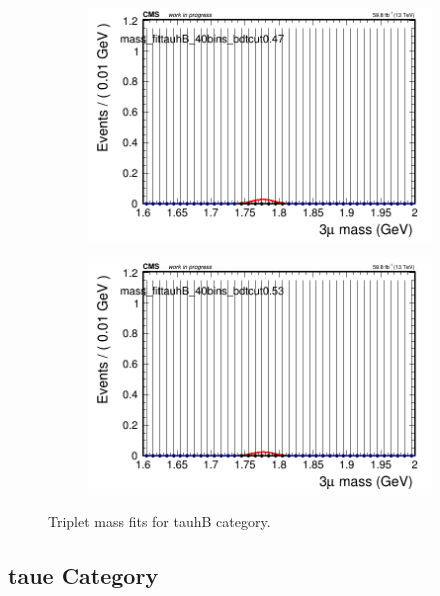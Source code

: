 \begin{figure}[H]
\begin{subfigure}{0.2\textwidth}
        \includegraphics[width=\textwidth]{power_law/plots/tauhB/massfit_tauhB_40bins_bdtcut0.47.png}
        \caption{}
    \end{subfigure}
    \begin{subfigure}{0.2\textwidth}
        \includegraphics[width=\textwidth]{power_law/plots/tauhB/massfit_tauhB_40bins_bdtcut0.53.png}
        \caption{}
    \end{subfigure}
    \caption{Triplet mass fits for tauhB category.}
    \label{fig:powerlawtauhB}
\end{figure}

\subsection{taue Category}
\label{sec:powerlawtaue}

